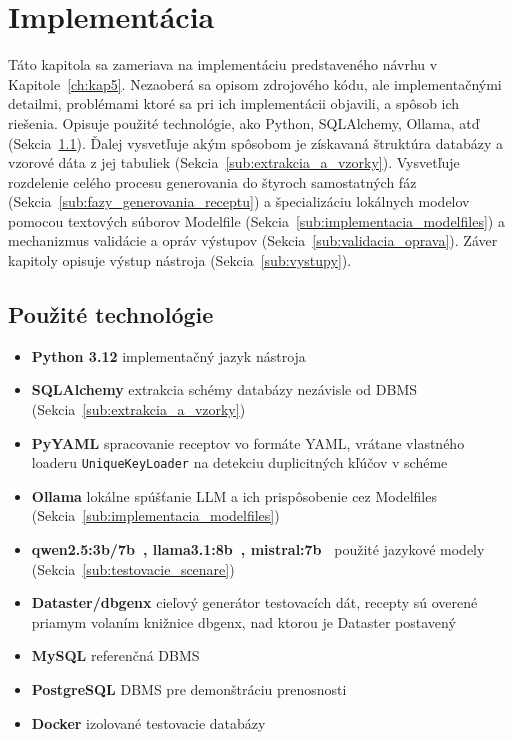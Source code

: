 \chapter{Implementácia}
\label{ch:kap6}
Táto kapitola sa zameriava na implementáciu predstaveného návrhu v Kapitole~\ref{ch:kap5}. Nezaoberá sa  opisom zdrojového kódu, ale implementačnými detailmi, problémami ktoré sa pri ich implementácii objavili, a spôsob ich riešenia. Opisuje použité technológie, ako Python, SQLAlchemy, Ollama, atď (Sekcia~\ref{sub:pouzite_technologie}).  Ďalej vysvetľuje akým spôsobom je získavaná štruktúra databázy a vzorové dáta z jej tabuliek (Sekcia~\ref{sub:extrakcia_a_vzorky}). Vysvetľuje rozdelenie celého procesu generovania do štyroch samostatných fáz (Sekcia~\ref{sub:fazy_generovania_receptu}) a špecializáciu lokálnych modelov pomocou textových súborov Modelfile (Sekcia~\ref{sub:implementacia_modelfiles}) a mechanizmus validácie a opráv výstupov (Sekcia~\ref{sub:validacia_oprava}). Záver kapitoly opisuje výstup nástroja (Sekcia~\ref{sub:vystupy}).

\section{Použité technológie}
\label{sub:pouzite_technologie}

\begin{itemize}
    \item \textbf{Python 3.12} implementačný jazyk nástroja
    \item \textbf{SQLAlchemy} extrakcia schémy databázy nezávisle od DBMS (Sekcia~\ref{sub:extrakcia_a_vzorky})
    \item \textbf{PyYAML} spracovanie receptov vo formáte YAML, vrátane vlastného loaderu \newline \texttt{UniqueKeyLoader} na detekciu duplicitných kľúčov v schéme
    \item \textbf{Ollama} lokálne spúšťanie LLM a ich prispôsobenie cez Modelfiles (Sekcia~\ref{sub:implementacia_modelfiles})
    \item \textbf{qwen2.5:3b/7b~\cite{Qwen2025}, llama3.1:8b~\cite{Llama2024}, mistral:7b~\cite{Mistral7b}} použité jazykové modely (Sekcia~\ref{sub:testovacie_scenare})
    \item \textbf{Dataster/dbgenx} cieľový generátor testovacích dát, recepty sú overené priamym volaním knižnice dbgenx, nad ktorou je Dataster postavený
    \item \textbf{MySQL} referenčná DBMS
    \item \textbf{PostgreSQL} DBMS pre demonštráciu prenosnosti
    \item \textbf{Docker} izolované testovacie databázy
    
\end{itemize}

